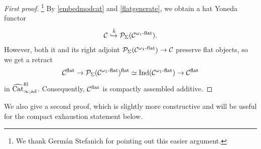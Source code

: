 \documentclass[a4paper,10pt, oneside]{amsart}
\begin{document}
	\begin{proof}[First proof]\!\!\!\footnote{We thank Germán Stefanich for pointing out this easier argument.}
		By \cref{embedmodcat} and \cref{flatgenerate}, we obtain a hat Yoneda functor $$\mathcal{C}\xhookrightarrow{\hat{h}}\mathcal{P}_\Sigma(\mathcal{C}^{\omega_1\text{-}\mathrm{flat}}).$$ However, both it and its right adjoint $\mathcal{P}_\Sigma(\mathcal{C}^{\omega_1\text{-}\mathrm{flat}})\to \mathcal{C}$ preserve flat objects, so we get a retract $$\mathcal{C}^{\mathrm{flat}}\to \mathcal{P}_\Sigma(\mathcal{C}^{\omega_1\text{-}\mathrm{flat}})^{\mathrm{flat}}\simeq\mathrm{Ind}(\mathcal{C}^{\omega_1\text{-}\mathrm{flat}})\to \mathcal{C}^{\mathrm{flat}}$$ in $\widehat{\mathrm{Cat}}_{\infty,\mathrm{ad}}^{\mathrm{fil}}$. Consequently, $\mathcal{C}^{\mathrm{flat}}$ is compactly assembled additive.
	\end{proof}
	We also give a second proof, which is slightly more constructive and will be useful for the compact exhaustion statement below.
\end{document}
